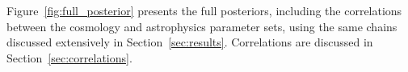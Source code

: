 Figure~\ref{fig:full_posterior} presents the full posteriors, including the correlations between the cosmology and astrophysics parameter sets, using the same chains discussed extensively in Section~\ref{sec:results}.
Correlations are discussed in Section~\ref{sec:correlations}.









